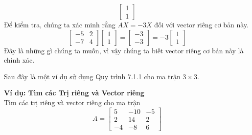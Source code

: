 \begin{equation*}
\begin{bmatrix}1\\ 1\end{bmatrix}
\end{equation*}
Để kiểm tra, chúng ta xác minh rằng $AX=-3X$ đối với vector riêng cơ bản này.
\begin{equation*}
\begin{bmatrix}-5&2\\ -7&4\end{bmatrix}\begin{bmatrix}1\\ 1\end{bmatrix}=\begin{bmatrix}-3\\ -3\end{bmatrix}=-3\begin{bmatrix}1\\ 1\end{bmatrix}
\end{equation*}
Đây là những gì chúng ta muốn, vì vậy chúng ta biết vector riêng cơ bản này là chính xác.

Sau đây là một ví dụ sử dụng Quy trình 7.1.1 cho ma trận $3\times3$.

\textbf{Ví dụ: Tìm các Trị riêng và Vector riêng} \\
Tìm các trị riêng và vector riêng cho ma trận
\begin{equation*}
A=\begin{bmatrix}5&-10&-5\\ 2&14&2\\ -4&-8&6\end{bmatrix}
\end{equation*}

